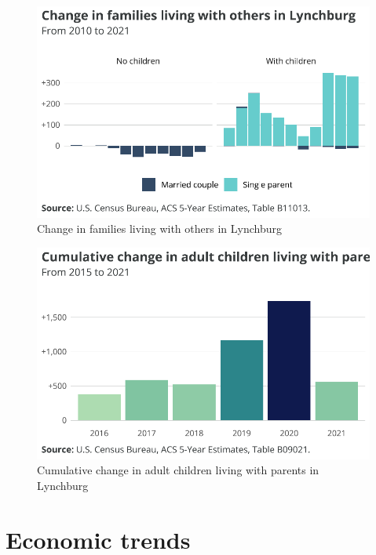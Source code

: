 \documentclass[
  letterpaper,
  DIV=11,
  numbers=noendperiod]{scrreprt}
\begin{document}
\begin{figure}[H]

{\centering \includegraphics{./part-3-3_files/figure-pdf/fig-subfam-1.pdf}

}

\caption{\label{fig-subfam}Change in families living with others in
Lynchburg}

\end{figure}

\begin{figure}[H]

{\centering \includegraphics{./part-3-3_files/figure-pdf/fig-achild-1.pdf}

}

\caption{\label{fig-achild}Cumulative change in adult children living
with parents in Lynchburg}

\end{figure}

\hypertarget{economic-trends-2}{%
\section{Economic trends}\label{economic-trends-2}}
\end{document}
